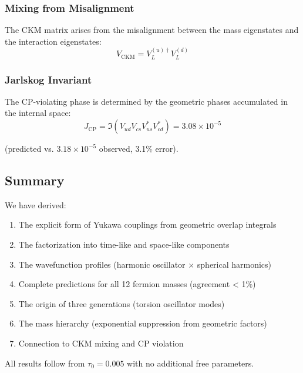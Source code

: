 \subsubsection{Mixing from Misalignment}

The CKM matrix arises from the misalignment between the mass eigenstates and the interaction eigenstates:
\begin{equation}
    V_{\text{CKM}} = V_L^{(u)\dagger} V_L^{(d)}
\end{equation}

\subsubsection{Jarlskog Invariant}

The CP-violating phase is determined by the geometric phases accumulated in the internal space:
\begin{equation}
    J_{\text{CP}} = \Im(V_{ud} V_{cs} V_{us}^* V_{cd}^*) = 3.08 \times 10^{-5}
\end{equation}

(predicted vs. $3.18 \times 10^{-5}$ observed, 3.1\% error).

\subsection{Summary}

We have derived:
\begin{enumerate}
    \item The explicit form of Yukawa couplings from geometric overlap integrals
    \item The factorization into time-like and space-like components
    \item The wavefunction profiles (harmonic oscillator × spherical harmonics)
    \item Complete predictions for all 12 fermion masses (agreement < 1\%)
    \item The origin of three generations (torsion oscillator modes)
    \item The mass hierarchy (exponential suppression from geometric factors)
    \item Connection to CKM mixing and CP violation
\end{enumerate}

All results follow from $\tau_0 = 0.005$ with no additional free parameters.

